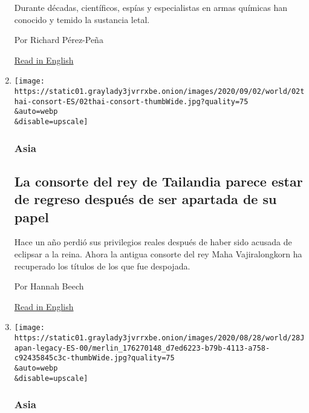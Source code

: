 \begin{enumerate}
  Durante décadas, científicos, espías y especialistas en armas químicas
  han conocido y temido la sustancia letal.

  Por Richard Pérez-Peña

  \href{https://www.nytimes3xbfgragh.onion/2020/09/02/world/europe/novichok-skripal.html}{Read
  in English}
\item
  \href{/es/2020/09/02/espanol/mundo/consorte-real-tailandia.html}{}

  \texttt{[image: https://static01.graylady3jvrrxbe.onion/images/2020/09/02/world/02thai-consort-ES/02thai-consort-thumbWide.jpg?quality=75\\\&auto=webp\\\&disable=upscale]}

  \hypertarget{asia-2}{%
  \subsubsection{Asia}\label{asia-2}}

  \hypertarget{la-consorte-del-rey-de-tailandia-parece-estar-de-regreso-despuuxe9s-de-ser-apartada-de-su-papel}{%
  \subsection{La consorte del rey de Tailandia parece estar de regreso
  después de ser apartada de su
  papel}\label{la-consorte-del-rey-de-tailandia-parece-estar-de-regreso-despuuxe9s-de-ser-apartada-de-su-papel}}

  Hace un año perdió sus privilegios reales después de haber sido
  acusada de eclipsar a la reina. Ahora la antigua consorte del rey Maha
  Vajiralongkorn ha recuperado los títulos de los que fue despojada.

  Por Hannah Beech

  \href{https://www.nytimes3xbfgragh.onion/2020/09/02/world/asia/thailand-king-consort.html}{Read
  in English}
\item
  \href{/es/2020/08/28/espanol/mundo/shinzo-abe-japon.html}{}

  \texttt{[image: https://static01.graylady3jvrrxbe.onion/images/2020/08/28/world/28Japan-legacy-ES-00/merlin\_176270148\_d7ed6223-b79b-4113-a758-c92435845c3c-thumbWide.jpg?quality=75\\\&auto=webp\\\&disable=upscale]}

  \hypertarget{asia-3}{%
  \subsubsection{Asia}\label{asia-3}}

  \hypertarget{el-legado-de-shinzo-abe-el-primer-ministro-de-japuxf3n-que-anunciuxf3-su-dimisiuxf3n}{%
}
\end{enumerate}
